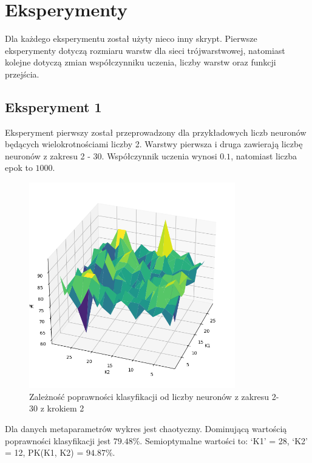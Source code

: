 \documentclass{article}
\begin{document}
\newpage
\section{Eksperymenty}
Dla każdego eksperymentu został użyty nieco inny skrypt.
Pierwsze eksperymenty dotyczą rozmiaru warstw dla sieci trójwarstwowej, natomiast kolejne dotyczą zmian współczynniku uczenia, liczby warstw oraz funkcji przejścia.

\subsection{Eksperyment 1}

Eksperyment pierwszy został przeprowadzony dla przykładowych liczb neuronów będących wielokrotnościami liczby 2.
Warstwy pierwsza i druga zawierają liczbę neuronów z zakresu 2 - 30.
Współczynnik uczenia wynosi $0.1$, natomiast liczba epok to $1000$.

\begin{figure}[H]
    \centering
    \includegraphics[width=0.8\textwidth, keepaspectratio]{k1_k2_dobre_1_1000echo.png}
    \caption{Zależność poprawności klasyfikacji od liczby neuronów z zakresu 2-30 z krokiem 2}
    \label{fig:k1k2_1}
\end{figure}

Dla danych metaparametrów wykres jest chaotyczny.
Dominującą wartością poprawności klasyfikacji jest $79.48\%$.
Semioptymalne wartości to: `K1' = 28, `K2' = 12, PK(K1, K2) = $94.87\%$.

\newpage
\end{document}
